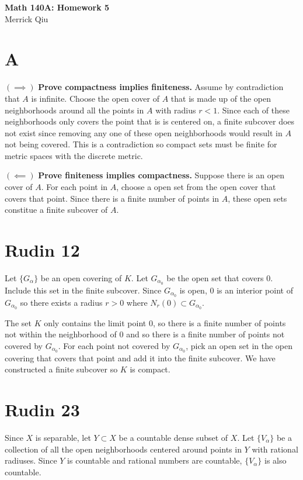 \documentclass{article}
\begin{document}
\begin{center}
	\huge{\bf Math 140A: Homework 5} \\
	Merrick Qiu
\end{center}
\section*{A}
$(\implies)$ \textbf{Prove compactness implies finiteness.}
Assume by contradiction that $A$ is infinite.
Choose the open cover of $A$ that is made up of the open 
neighborhoods around all the points in $A$ with radius $r < 1$.
Since each of these neighborhoods only covers the point 
that is is centered on,
a finite subcover does not exist since 
removing any one of these open neighborhoods would result 
in $A$ not being covered.
This is a contradiction so compact sets must be finite 
for metric spaces with the discrete metric.

$(\impliedby)$ \textbf{Prove finiteness implies compactness.}
Suppose there is an open cover of $A$.
For each point in $A$, choose a open set from the open cover 
that covers that point.
Since there is a finite number of points in $A$,
these open sets constitue a finite subcover of $A$.

\section*{Rudin 12}
Let $\{G_{\alpha}\}$ be an open covering of $K$.
Let $G_{\alpha_0}$ be the open set that covers $0$.
Include this set in the finite subcover.
Since $G_{\alpha_0}$ is open, $0$ is an interior point 
of $G_{\alpha_0}$ so there exists a radius $r > 0$
where $N_r(0) \subset G_{\alpha_0}$.

The set $K$ only contains the limit point $0$,
so there is a finite number of points not within the 
neighborhood of $0$ and so there is a finite number of points 
not covered by $G_{\alpha_0}$.
For each point not covered by $G_{\alpha_0}$,
pick an open set in the open covering that covers that point 
and add it into the finite subcover.
We have constructed a finite subcover so $K$ is compact.

\section*{Rudin 23}
Since $X$ is separable, let 
$Y \subset X$ be a countable dense subset of $X$.
Let $\{V_{\alpha}\}$ be a collection of all the 
open neighborhoods centered around points in $Y$
with rational radiuses.
Since $Y$ is countable and rational numbers are countable,
$\{V_{\alpha}\}$ is also countable.
\end{document}
